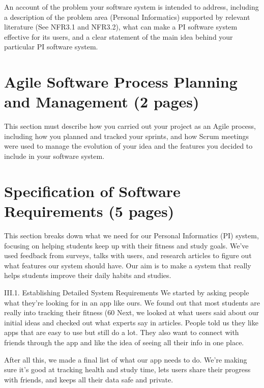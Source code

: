 \documentclass[12pt]{article}
\begin{document}
An account of the problem your software system is intended to address, including a
description of the problem area (Personal Informatics) supported by relevant literature (See
NFR3.1 and NFR3.2), what can make a PI software system effective for its users, and a clear
statement of the main idea behind your particular PI software system.


\section{Agile Software Process Planning and Management (2 pages)}

This section must describe how you carried out your project as an Agile process, including
how you planned and tracked your sprints, and how Scrum meetings were used to manage
the evolution of your idea and the features you decided to include in your software system.


\section{Specification of Software Requirements (5 pages)}

This section breaks down what we need for our Personal Informatics (PI) system, 
focusing on helping students keep up with their fitness and study goals. 
We've used feedback from surveys, talks with users, and research articles to 
figure out what features our system should have. Our aim is to make a system 
that really helps students improve their daily habits and studies.\par

III.1. Establishing Detailed System Requirements
We started by asking people what they're looking for in an app like ours. We found out that most students are really into tracking their fitness (60%
Next, we looked at what users said about our initial ideas and checked out what experts say in articles. People told us they like apps that are easy to use but still do a lot. They also want to connect with friends through the app and like the idea of seeing all their info in one place.\par
After all this, we made a final list of what our app needs to do. We're making sure it's good at tracking health and study time, lets users share their progress with friends, and keeps all their data safe and private.\par
 
\end{document}
